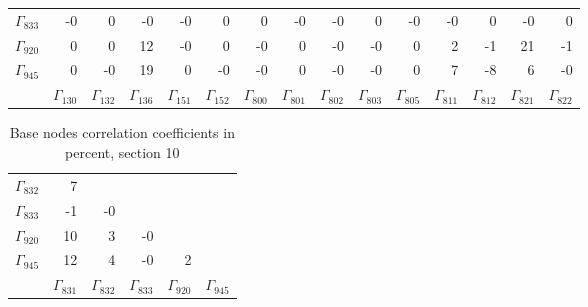 {\begin{table}
\begin{center}
\begin{minipage}{\linewidth}
\begin{center}
\begin{envsmall}
\begin{center}
\begin{tabular}{rrrrrrrrrrrrrrr}
\( \Gamma_{833} \) &   -0 &    0 &   -0 &   -0 &    0 &    0 &   -0 &   -0 &    0 &   -0 &   -0 &    0 &   -0 &    0 \\
\( \Gamma_{920} \) &    0 &    0 &   12 &   -0 &    0 &   -0 &    0 &   -0 &   -0 &    0 &    2 &   -1 &   21 &   -1 \\
\( \Gamma_{945} \) &    0 &   -0 &   19 &    0 &   -0 &   -0 &    0 &   -0 &   -0 &    0 &    7 &   -8 &    6 &   -0 \\
 & \( \Gamma_{130} \) & \( \Gamma_{132} \) & \( \Gamma_{136} \) & \( \Gamma_{151} \) & \( \Gamma_{152} \) & \( \Gamma_{800} \) & \( \Gamma_{801} \) & \( \Gamma_{802} \) & \( \Gamma_{803} \) & \( \Gamma_{805} \) & \( \Gamma_{811} \) & \( \Gamma_{812} \) & \( \Gamma_{821} \) & \( \Gamma_{822} \)
\\\hline
\end{tabular}
\end{center}
\end{envsmall}
\ifhevea\else
\end{center}
\end{minipage}
\fi
\end{center}
\ifhevea\end{table}\fi
\ifhevea\begin{table}\fi%
\begin{center}
\ifhevea
\caption{Base nodes correlation coefficients in percent, section 10\label{tab:br-fit-corr10}}%
\else
\begin{minipage}{\linewidth}
\begin{center}
\label{tab:br-fit-corr10}%
\fi
\begin{envsmall}
\begin{center}
\renewcommand*{\arraystretch}{1.1}%
\begin{tabular}{rrrrrr}
\hline
\( \Gamma_{832} \) &    7 &  &  &  &  \\
\( \Gamma_{833} \) &   -1 &   -0 &  &  &  \\
\( \Gamma_{920} \) &   10 &    3 &   -0 &  &  \\
\( \Gamma_{945} \) &   12 &    4 &   -0 &    2 &  \\
 & \( \Gamma_{831} \) & \( \Gamma_{832} \) & \( \Gamma_{833} \) & \( \Gamma_{920} \) & \( \Gamma_{945} \)
\\\hline
\end{tabular}
\end{center}
\end{envsmall}
\ifhevea\else
\end{center}
\end{minipage}
\fi
\end{center}
\ifhevea\end{table}\fi}%
